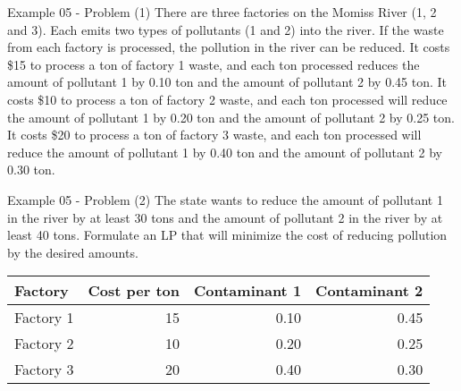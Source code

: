 \begin{frame}{Example 05 - Problem (1)}
There are three factories on the Momiss River (1, 2 and 3). Each emits two types
of pollutants (1 and 2) into the river. If the waste from each factory is
processed, the pollution in the river can be reduced. It costs \$15 to process a
ton of factory 1 waste, and each ton processed reduces the amount of pollutant 1
by 0.10 ton and the amount of pollutant 2 by 0.45 ton. It costs \$10 to process
a ton of factory 2 waste, and each ton processed will reduce the amount of
pollutant 1 by 0.20 ton and the amount of pollutant 2 by 0.25 ton. It costs \$20
to process a ton of factory 3 waste, and each ton processed will reduce the
amount of pollutant 1 by 0.40 ton and the amount of pollutant 2 by 0.30 ton.
\end{frame}

\begin{frame}{Example 05 - Problem (2)}
The state wants to reduce the amount of pollutant 1 in the river by at least 30
tons and the amount of pollutant 2 in the river by at least 40 tons. Formulate
an LP that will minimize the cost of reducing pollution by the desired amounts.

\begin{center}
\begin{tabular}{lrrr}
\hline
  \cellcolor{gray90}\textbf{Factory}
& \cellcolor{gray90}\textbf{Cost per ton}
& \cellcolor{gray90}\textbf{Contaminant 1}
& \cellcolor{gray90}\textbf{Contaminant 2} \\
\hline
Factory 1 & 15 & 0.10 & 0.45 \\
Factory 2 & 10 & 0.20 & 0.25 \\
Factory 3 & 20 & 0.40 & 0.30 \\
\hline
\end{tabular}
\end{center}

\end{frame}

